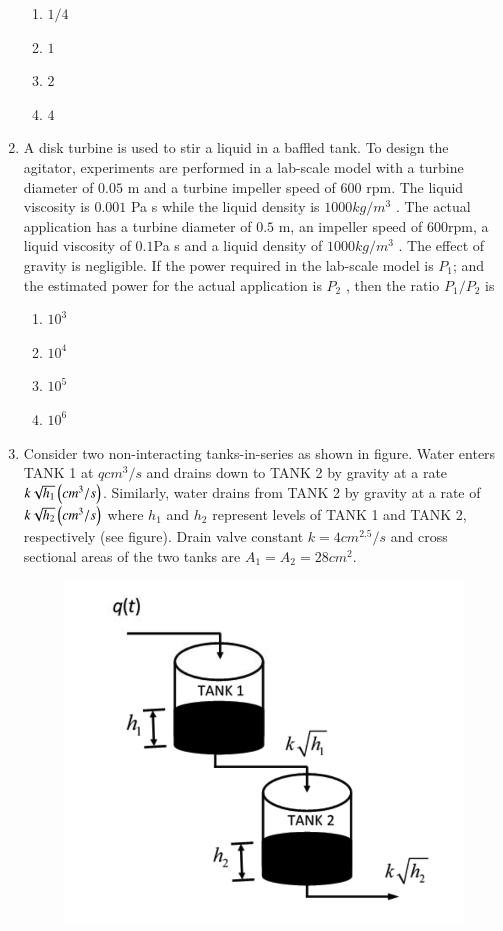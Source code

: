 \documentclass[journal,12pt,onecolumn]{IEEEtran}
\theoremstyle{remark}
\begin{document}
\begin{enumerate}
     \hfill{}
    \begin{multicols}{4}
\begin{enumerate}
    \item $1/4$
    \item $1$
    \item $2$
    \item $4$
\end{enumerate}
\end{multicols}

    \item A disk turbine is used to stir a liquid in a baffled tank. To design the agitator, experiments are performed in a lab-scale model with a turbine diameter of $0.05$ m and a turbine impeller speed of $600$ rpm. The liquid viscosity is $0.001$ Pa s while the liquid density is $1000 kg/m^3$ . The actual application has a turbine diameter of $0.5$ m, an impeller speed of $600$rpm, a liquid viscosity of $0.1$Pa s and a liquid density of $1000 kg/m^3$ . The effect of gravity is negligible. If the power required in the lab-scale model is $P_1$; and the estimated power for the actual application is $P_2$ , then the ratio $P_1/P_2$ is 
    
     \hfill{}
\begin{multicols}{4}
    \begin{enumerate}
        \item $10^3$
        \item $10^4$
        \item $10^5$
        \item $10^6$
        \end{enumerate}
\end{multicols}
\newpage
    \item 
        Consider two non-interacting tanks-in-series as shown in figure. Water enters TANK 1 at $q cm^3/s$ and drains down to TANK 2 by gravity at a rate $k\sqrt{h_1}\left(cm^3/s\right)$. Similarly, water drains from TANK 2 by gravity at a rate of $k\sqrt{h_2}\left(cm^3/s\right)$ where $h_1$ and $h_2$ represent levels of TANK 1 and TANK 2, respectively (see figure). Drain valve constant $k = 4 cm^{2.5}/s$ and cross sectional areas of the two tanks are $A_1 = A_2 = 28 cm^2$.
     

\begin{figure}[H]
    \centering
    \includegraphics[width=0.4\columnwidth]{Fig/30.png}
    \caption*{}
    \label{fig: 30}
  

\end{figure}
\end{enumerate}
\end{document}
